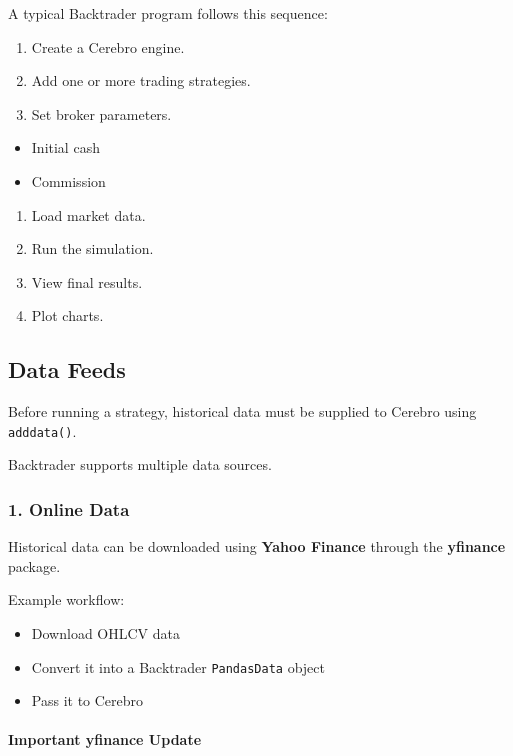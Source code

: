 \documentclass[12pt,openany]{book}
\begin{document}
A typical Backtrader program follows this sequence:

\begin{enumerate}[leftmargin=*]
    \item Create a Cerebro engine.
    \item Add one or more trading strategies.
    \item Set broker parameters.
\end{enumerate}

\begin{itemize}[leftmargin=*]
    \item Initial cash
    \item Commission
\end{itemize}
\begin{enumerate}[leftmargin=*]
    \item Load market data.
    \item Run the simulation.
    \item View final results.
    \item Plot charts.
\end{enumerate}

\subsection{Data Feeds}

Before running a strategy, historical data must be supplied to Cerebro using \texttt{adddata()}.

Backtrader supports multiple data sources.

\subsubsection{1. Online Data}

Historical data can be downloaded using \textbf{Yahoo Finance} through the \textbf{yfinance} package.

Example workflow:

\begin{itemize}[leftmargin=*]
    \item Download OHLCV data
    \item Convert it into a Backtrader \texttt{PandasData} object
    \item Pass it to Cerebro
\end{itemize}

\paragraph{Important yfinance Update}
\end{document}
